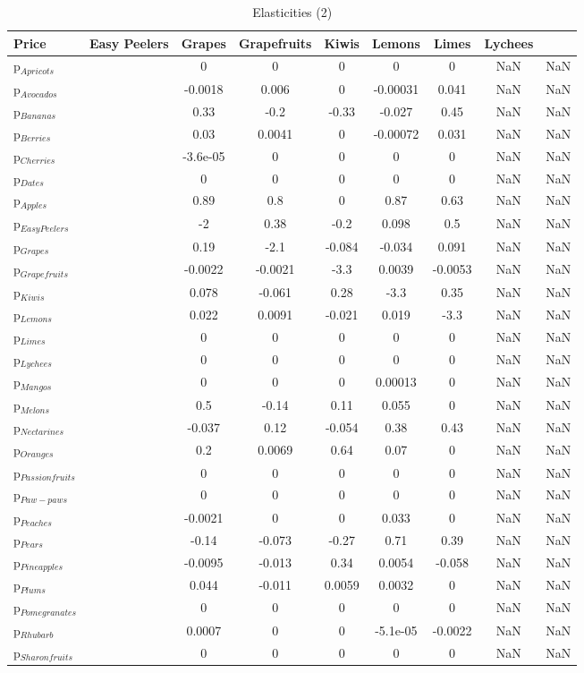 \documentclass[11pt]{article}
\begin{document}
\begin{table}[h]
\caption{Elasticities (2)}
\label{Table: elasticities 2}
\begin{center}
\begin{tabular}{lccccccc} \hline \hline
Price &Easy Peelers &Grapes &Grapefruits &Kiwis &Lemons &Limes &Lychees \\ \hline
p$_{Apricots}$ & &0 &0 &0 &0 &0 &NaN &NaN \\
p$_{Avocados}$ & &-0.0018 &0.006 &0 &-0.00031 &0.041 &NaN &NaN \\
p$_{Bananas}$ & &0.33 &-0.2 &-0.33 &-0.027 &0.45 &NaN &NaN \\
p$_{Berries}$ & &0.03 &0.0041 &0 &-0.00072 &0.031 &NaN &NaN \\
p$_{Cherries}$ & &-3.6e-05 &0 &0 &0 &0 &NaN &NaN \\
p$_{Dates}$ & &0 &0 &0 &0 &0 &NaN &NaN \\
p$_{Apples}$ & &0.89 &0.8 &0 &0.87 &0.63 &NaN &NaN \\
p$_{Easy Peelers}$ & &-2 &0.38 &-0.2 &0.098 &0.5 &NaN &NaN \\
p$_{Grapes}$ & &0.19 &-2.1 &-0.084 &-0.034 &0.091 &NaN &NaN \\
p$_{Grapefruits}$ & &-0.0022 &-0.0021 &-3.3 &0.0039 &-0.0053 &NaN &NaN \\
p$_{Kiwis}$ & &0.078 &-0.061 &0.28 &-3.3 &0.35 &NaN &NaN \\
p$_{Lemons}$ & &0.022 &0.0091 &-0.021 &0.019 &-3.3 &NaN &NaN \\
p$_{Limes}$ & &0 &0 &0 &0 &0 &NaN &NaN \\
p$_{Lychees}$ & &0 &0 &0 &0 &0 &NaN &NaN \\
p$_{Mangos}$ & &0 &0 &0 &0.00013 &0 &NaN &NaN \\
p$_{Melons}$ & &0.5 &-0.14 &0.11 &0.055 &0 &NaN &NaN \\
p$_{Nectarines}$ & &-0.037 &0.12 &-0.054 &0.38 &0.43 &NaN &NaN \\
p$_{Oranges}$ & &0.2 &0.0069 &0.64 &0.07 &0 &NaN &NaN \\
p$_{Passion fruits}$ & &0 &0 &0 &0 &0 &NaN &NaN \\
p$_{Paw-paws}$ & &0 &0 &0 &0 &0 &NaN &NaN \\
p$_{Peaches}$ & &-0.0021 &0 &0 &0.033 &0 &NaN &NaN \\
p$_{Pears}$ & &-0.14 &-0.073 &-0.27 &0.71 &0.39 &NaN &NaN \\
p$_{Pineapples}$ & &-0.0095 &-0.013 &0.34 &0.0054 &-0.058 &NaN &NaN \\
p$_{Plums}$ & &0.044 &-0.011 &0.0059 &0.0032 &0 &NaN &NaN \\
p$_{Pomegranates}$ & &0 &0 &0 &0 &0 &NaN &NaN \\
p$_{Rhubarb}$ & &0.0007 &0 &0 &-5.1e-05 &-0.0022 &NaN &NaN \\
p$_{Sharon fruits}$ & &0 &0 &0 &0 &0 &NaN &NaN \\
\end{tabular}
\end{center}
\end{table}
\end{document}

